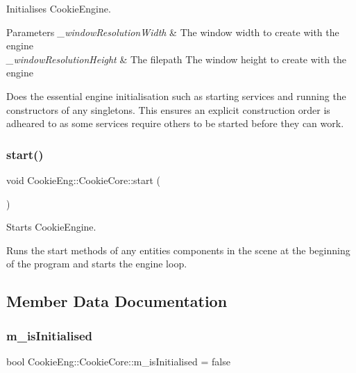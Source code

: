 Initialises Cookie\+Engine. 


\begin{DoxyParams}{Parameters}
{\em \+\_\+window\+Resolution\+Width} & The window width to create with the engine \\
\hline
{\em \+\_\+window\+Resolution\+Height} & The filepath The window height to create with the engine\\
\hline
\end{DoxyParams}
Does the essential engine initialisation such as starting services and running the constructors of any singletons. This ensures an explicit construction order is adheared to as some services require others to be started before they can work. \mbox{\label{class_cookie_eng_1_1_cookie_core_a30f6d3ab2c753095de7d61c69dddbd87}} 
\subsubsection{\texorpdfstring{start()}{start()}}
{\footnotesize\ttfamily void Cookie\+Eng\+::\+Cookie\+Core\+::start (\begin{DoxyParamCaption}{ }\end{DoxyParamCaption})}



Starts Cookie\+Engine. 

Runs the start methods of any entities components in the scene at the beginning of the program and starts the engine loop. 

\subsection{Member Data Documentation}
\mbox{\label{class_cookie_eng_1_1_cookie_core_a56072701bf07b2f787081cf41f5ae254}} 
\subsubsection{\texorpdfstring{m\+\_\+is\+Initialised}{m\_isInitialised}}
{\footnotesize\ttfamily bool Cookie\+Eng\+::\+Cookie\+Core\+::m\+\_\+is\+Initialised = false\hspace{0.3cm}{\ttfamily [protected]}}

